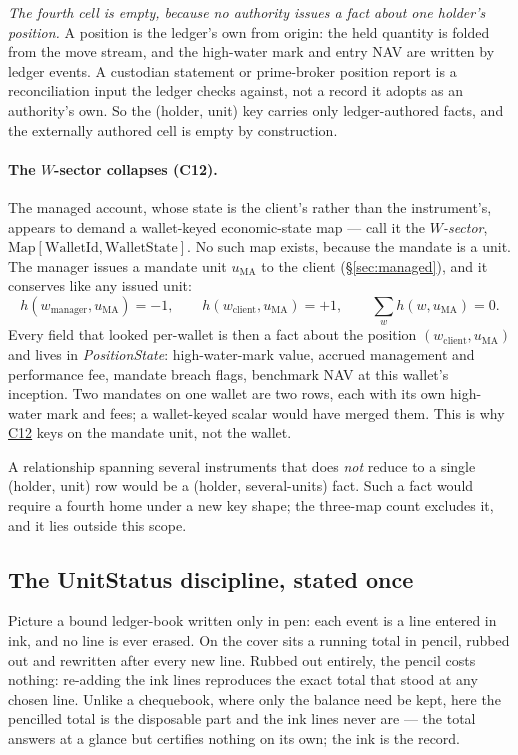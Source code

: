 \emph{The fourth cell is empty, because no authority issues a fact about one holder's
position.} A position is the ledger's own from origin: the held quantity is folded from
the move stream, and the high-water mark and entry NAV are written by ledger events. A
custodian statement or prime-broker position report is a reconciliation input the ledger
checks against, not a record it adopts as an authority's own. So the (holder, unit) key
carries only ledger-authored facts, and the externally authored cell is empty by
construction.

\paragraph{The $W$-sector collapses (C12).}
The managed account, whose state is the client's rather than the instrument's, appears
to demand a wallet-keyed economic-state map --- call it the \emph{$W$-sector},
$\mathrm{Map}[\mathrm{WalletId},\mathrm{WalletState}]$. No such map exists, because the
mandate is a unit. The manager issues a mandate unit $u_{\mathrm{MA}}$ to the
client (\S\ref{sec:managed}), and it conserves like any issued unit:
\[
h(w_{\mathrm{manager}},u_{\mathrm{MA}})=-1,\qquad
h(w_{\mathrm{client}},u_{\mathrm{MA}})=+1,\qquad
\sum_{w}h(w,u_{\mathrm{MA}})=0 .
\]
Every field that looked per-wallet is then a fact about the position
$(w_{\mathrm{client}},u_{\mathrm{MA}})$ and lives in \emph{PositionState}:
high-water-mark value, accrued management and performance fee, mandate breach flags,
benchmark NAV at this wallet's inception. Two mandates on one wallet are two rows, each with its own
high-water mark and fees; a wallet-keyed scalar would have merged them. This is why
\hyperref[cond:C12]{C12} keys on the mandate unit, not the wallet.

A relationship spanning
several instruments that does \emph{not} reduce to a single (holder, unit) row would be a
(holder, several-units) fact. Such a fact would require a fourth home under a new key
shape; the three-map count excludes it, and it lies outside this scope.

\subsection{The UnitStatus discipline, stated once}
\label{sec:states-unitstatus}

\begin{mentalmodel}
Picture a bound ledger-book written only in pen: each event is a line entered in ink,
and no line is ever erased. On the cover sits a running total in pencil, rubbed out and
rewritten after every new line. Rubbed out entirely, the pencil costs nothing: re-adding
the ink lines reproduces the exact total that stood at any chosen line. Unlike a
chequebook, where only the balance need be kept, here the pencilled total is the
disposable part and the ink lines never are --- the total answers at a glance but
certifies nothing on its own; the ink is the record.
\end{mentalmodel}

